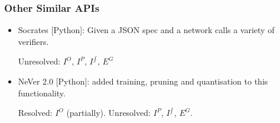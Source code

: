 \documentclass[t,compress,aspectratio=169]{beamer}
\begin{document}
\begin{frame}
\frametitle{Other Similar APIs}

\begin{itemize}

\item Socrates [Python]:  Given a JSON spec and a network calls a variety of verifiers.

\begin{thebibliography}{99}
	\beamertemplatearticlebibitems
\end{thebibliography}

\vspace{0.5em}

Unresolved: $I^O$, $I^P$, $I^{\int}$, $E^G$

\pause
\vspace{1.5em}
 
\item NeVer 2.0 [Python]: added training, pruning and quantisation to this functionality.

\begin{thebibliography}{99}
	\beamertemplatearticlebibitems
\end{thebibliography}

\vspace{0.5em}

Resolved: $I^O$ (partially). Unresolved: $I^P$, $I^{\int}$, $E^G$.
\end{itemize}
\end{frame}
\end{document}
